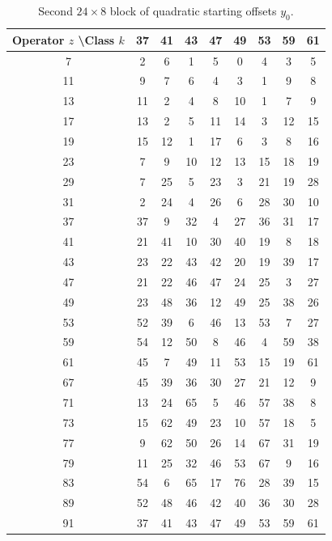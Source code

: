 \documentclass[11pt,a4paper]{article}
\begin{document}
\begin{table}[htbp]
\centering
\tiny
\begin{tabular}{c|cccccccc}
Operator \(z\) \textbackslash Class \(k\) & 37 & 41 & 43 & 47 & 49 & 53 & 59 & 61 \\
\hline
7  & 2 & 6 & 1 & 5 & 0 & 4 & 3 & 5 \\
11 & 9 & 7 & 6 & 4 & 3 & 1 & 9 & 8 \\
13 & 11 & 2 & 4 & 8 & 10 & 1 & 7 & 9 \\
17 & 13 & 2 & 5 & 11 & 14 & 3 & 12 & 15 \\
19 & 15 & 12 & 1 & 17 & 6 & 3 & 8 & 16 \\
23 & 7 & 9 & 10 & 12 & 13 & 15 & 18 & 19 \\
29 & 7 & 25 & 5 & 23 & 3 & 21 & 19 & 28 \\
31 & 2 & 24 & 4 & 26 & 6 & 28 & 30 & 10 \\
37 & 37 & 9 & 32 & 4 & 27 & 36 & 31 & 17 \\
41 & 21 & 41 & 10 & 30 & 40 & 19 & 8 & 18 \\
43 & 23 & 22 & 43 & 42 & 20 & 19 & 39 & 17 \\
47 & 21 & 22 & 46 & 47 & 24 & 25 & 3 & 27 \\
49 & 23 & 48 & 36 & 12 & 49 & 25 & 38 & 26 \\
53 & 52 & 39 & 6 & 46 & 13 & 53 & 7 & 27 \\
59 & 54 & 12 & 50 & 8 & 46 & 4 & 59 & 38 \\
61 & 45 & 7 & 49 & 11 & 53 & 15 & 19 & 61 \\
67 & 45 & 39 & 36 & 30 & 27 & 21 & 12 & 9 \\
71 & 13 & 24 & 65 & 5 & 46 & 57 & 38 & 8 \\
73 & 15 & 62 & 49 & 23 & 10 & 57 & 18 & 5 \\
77 & 9 & 62 & 50 & 26 & 14 & 67 & 31 & 19 \\
79 & 11 & 25 & 32 & 46 & 53 & 67 & 9 & 16 \\
83 & 54 & 6 & 65 & 17 & 76 & 28 & 39 & 15 \\
89 & 52 & 48 & 46 & 42 & 40 & 36 & 30 & 28 \\
91 & 37 & 41 & 43 & 47 & 49 & 53 & 59 & 61 \\
\end{tabular}
\caption{Second \(24 \times 8\) block of quadratic starting offsets \(y_0\).}
\label{tab:y0-block2}
\end{table}
\end{document}
